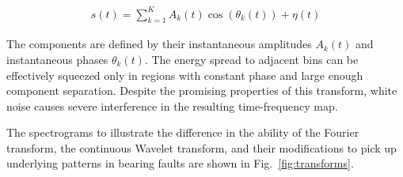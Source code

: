 \begin{ceqn}\begin{align}
s(t) = \sum_{k=1}^{K} A_k(t)\cos(\theta_k(t)) + \eta(t)
\label{equ:sst-transform}
\end{align}\end{ceqn}

The components are defined by their instantaneous amplitudes $A_k(t)$ and instantaneous phases $\theta_k(t)$. The energy spread to adjacent bins can be effectively squeezed only in regions with constant phase and large enough component separation. Despite the promising properties of this transform, white noise causes severe interference in the resulting time-frequency map.

The spectrograms to illustrate the difference in the ability of the Fourier transform, the continuous Wavelet transform, and their modifications to pick up underlying patterns in bearing faults are shown in Fig.~\ref{fig:transforms}.

